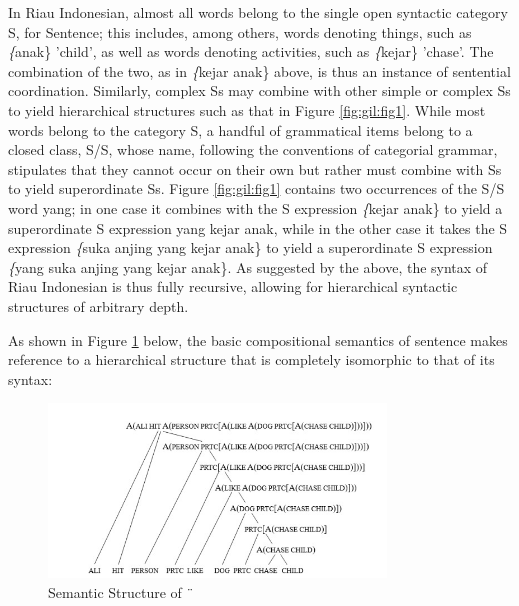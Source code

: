 \documentclass[output=paper,colorlinks,citecolor=brown
]{langscibook}
\begin{document}
In Riau Indonesian, almost all words belong to the single open syntactic category S, for Sentence; this includes, among others, words denoting things, such as \emph\{anak\} 'child', as well as words denoting activities, such as \emph\{kejar\} 'chase'. The combination of the two, as in \emph\{kejar anak\} above, is thus an instance of sentential coordination. Similarly, complex Ss may combine with other simple or complex Ss to yield hierarchical structures such as that in Figure \ref{fig:gil:fig1}. While most words belong to the category S, a handful of grammatical items belong to a closed class, S/S, whose name, following the conventions of categorial grammar, stipulates that they cannot occur on their own but rather must combine with Ss to yield superordinate Ss. Figure \ref{fig:gil:fig1} contains two occurrences of the S/S word yang; in one case it combines with the S expression \emph\{kejar anak\} to yield a superordinate S expression yang kejar anak, while in the other case it takes the S expression \emph\{suka anjing yang kejar anak\} to yield a superordinate S expression \emph\{yang suka anjing yang kejar anak\}. As suggested by the above, the syntax of Riau Indonesian is thus fully recursive, allowing for hierarchical syntactic structures of arbitrary depth.

As shown in Figure \ref{fig:gil:fig2} below, the basic compositional semantics of sentence  makes reference to a hierarchical structure that is completely isomorphic to that of its syntax:

\begin{figure}
\centering
\includegraphics[width=0.8\textwidth]{gil_figure2.png}
\caption{\label{fig:gil:fig2}Semantic Structure of ¨}
\end{figure}
\end{document}

